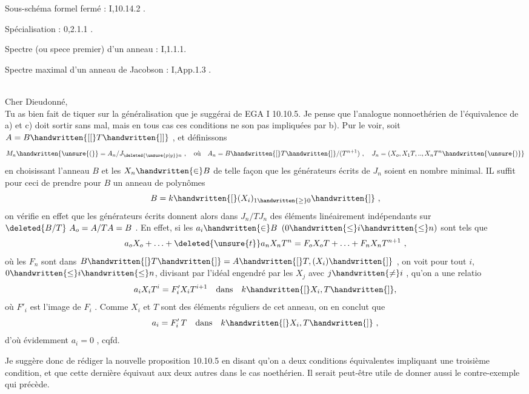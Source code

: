 Sous-schéma formel fermé : I,10.14.2 .

Spécialisation : 0,2.1.1 .

Spectre (ou spece premier) d'un anneau : I,1.1.1.

Spectre maximal d'un anneau de Jacobson : I,App.1.3 .

\noindent\hfill{}\\

\noindent Cher Dieudonné,\\

Tu as bien fait de tiquer sur la généralisation que je suggérai de EGA I 10.10.5. Je pense que l'analogue nonnoethérien de l'équivalence de a) et c) doit sortir sans mal, mais en tous cas ces conditions ne son pas impliquées par b). Pur le voir, soit $A=B\handwritten{[[}T\handwritten{]]}$ , et définissons
\[
M_n\handwritten{\unsure{(}}=A_n/J_{\deleted{\unsure{p|y}}n}\ ,\quad\text{où}\quad A_n=B\handwritten{[}T\handwritten{]}/(T^{n+1})\ ,\quad J_n=(X_o,X_1T,..,X_nT^n\handwritten{\unsure{)}}
\]
en choisissant l'anneau $B$ et les $X_n\handwritten{\in}B$ de telle façon que les générateurs écrits de $J_n$ soient en nombre minimal. IL suffit pour ceci de prendre pour $B$ un anneau de polynômes
\[
B=k\handwritten{[}(X_i)_{1\handwritten{\geq}0}\handwritten{]}\ ,
\]
on vérifie en effet que les générateurs écrits donnent alors dans $J_n/TJ_n$ des éléments linéairement indépendants sur $\deleted{B/T}\ A_o=A/TA=B$ . En effet, si les $a_i\handwritten{\in}B$ $(0\handwritten{\leq}i\handwritten{\leq}n)$ sont tels que
\[
a_oX_o+\ldots+\deleted{\unsure{t}}a_nX_nT^n=F_oX_oT+\ldots+F_nX_nT^{n+1}\ ,
\]
où les $F_n$ sont dans $B\handwritten{[}T\handwritten{]}=A\handwritten{[}T,(X_i)\handwritten{]}$ , on voit pour tout $i$, $0\handwritten{\leq}i\handwritten{\leq}n$, divisant par l'idéal engendré par les $X_j$ avec $j\handwritten{\ne}i$ , qu'on a une relatio
\[
a_iX_iT^i=F'_iX_iT^{i+1}\quad\text{dans}\quad k\handwritten{[}X_i,T\handwritten{]},
\]
où $F'_i$ est l'image de $F_i$ . Comme $X_i$ et $T$ sont des éléments réguliers de cet anneau, on en conclut que
\[
a_i=F'_i\,T\quad\text{dans}\quad k\handwritten{[}X_i,T\handwritten{]}\ ,
\]
d'où évidemment $a_i=0$ , cqfd.

Je suggère donc de rédiger la nouvelle proposition 10.10.5 en disant qu'on a deux conditions équivalentes  impliquant une troisième condition, et que cette dernière équivaut aux deux autres dans le cas noethérien. Il serait peut-être utile de donner aussi le contre-exemple qui précède.

